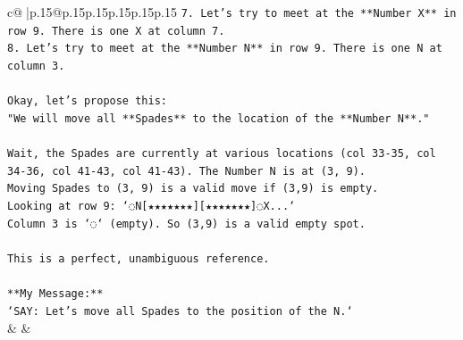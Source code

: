 \documentclass{article}
\begin{document}
{\begin{supertabular}{c@{$\;$}|p{.15\linewidth}@{}p{.15\linewidth}p{.15\linewidth}p{.15\linewidth}p{.15\linewidth}p{.15\linewidth}}
{{{\texttt{7.  Let's try to meet at the **Number X** in row 9. There is one X at column 7.} \\
\texttt{8.  Let's try to meet at the **Number N** in row 9. There is one N at column 3.} \\
\\ 
\texttt{Okay, let's propose this:} \\
\texttt{"We will move all **Spades** to the location of the **Number N**."} \\
\\ 
\texttt{Wait, the Spades are currently at various locations (col 33{-}35, col 34{-}36, col 41{-}43, col 41{-}43). The Number N is at (3, 9).} \\
\texttt{Moving Spades to (3, 9) is a valid move if (3,9) is empty.} \\
\texttt{Looking at row 9: `◌N{[}★★★★★★★{]}{[}★★★★★★★{]}◌X...`} \\
\texttt{Column 3 is `◌` (empty). So (3,9) is a valid empty spot.} \\
\\ 
\texttt{This is a perfect, unambiguous reference.} \\
\\ 
\texttt{**My Message:**} \\
\texttt{`SAY: Let's move all Spades to the position of the N.`} \\
            }
        }
    }
    & & \\ \\


\end{supertabular}}
\end{document}
